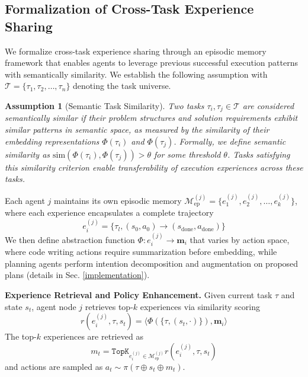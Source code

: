 \documentclass{article} %
\newtheorem{assumption}{Assumption}
\begin{document}
\subsection{Formalization of Cross-Task Experience Sharing}
\label{cross-task}
We formalize cross-task experience sharing through an episodic memory framework that enables agents to leverage previous successful execution patterns with semantically similarity. We establish the following assumption with $\mathcal{T} = \{\tau_1, \tau_2, \ldots, \tau_n\}$ denoting the task universe.
\begin{assumption}[Semantic Task Similarity]
\label{assumption1}
Two tasks $\tau_i, \tau_j \in \mathcal{T}$ are considered semantically similar if their problem structures and solution requirements exhibit similar patterns in semantic space, as measured by the similarity of their embedding representations $\Phi(\tau_i)$ and $\Phi(\tau_j)$. Formally, we define semantic similarity as $\text{sim}(\Phi(\tau_i), \Phi(\tau_j)) > \theta$ for some threshold $\theta$. Tasks satisfying this similarity criterion enable transferability of execution experiences across these tasks.
\end{assumption}
Each agent $j$ maintains its own episodic memory $\mathcal{M}_{\text{ep}}^{(j)} = \{e_1^{(j)}, e_2^{(j)}, \ldots, e_k^{(j)}\}$, where each experience encapsulates a complete trajectory
\begin{equation}
\label{eq4}
e_i^{(j)} = \{ \tau_l, (s_0, a_0) \rightarrow (s_\text{done}, a_\text{done}) \}
\end{equation}
We then define abstraction function $\Phi:e_i^{(j)} \rightarrow \mathbf{m}_i$ that varies by action space, where code writing actions require summarization before embedding, while planning agents perform intention decomposition and augmentation on proposed plans (details in Sec. \ref{implementation}).

\textbf{Experience Retrieval and Policy Enhancement.} Given current task $\tau$ and state $s_t$, agent node $j$ retrieves top-$k$ experiences via similarity scoring 
\begin{equation}
r(e_i^{(j)}, \tau, s_t) = \langle \Phi(\{ \tau, (s_t, \cdot) \}), \mathbf{m}_i \rangle
\end{equation}
The top-$k$ experiences are retrieved as
\begin{equation}
m_t = \texttt{TopK}_{e_i^{(j)} \in \mathcal{M}_{\text{ep}}^{(j)}} r(e_i^{(j)}, \tau, s_t)
\end{equation}
and actions are sampled as $a_t \sim \pi(\tau \oplus s_t \oplus m_t)$. 
\end{document}
